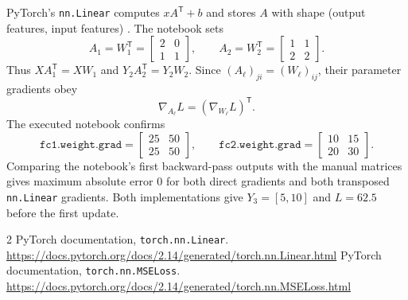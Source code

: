 \documentclass[11pt]{article}
\begin{document}
PyTorch's \texttt{nn.Linear} computes $xA^{\mathsf T}+b$ and stores $A$ with
shape (output features, input features) \cite{linear}. The notebook sets
\[
A_1=W_1^{\mathsf T}=\begin{bmatrix}2&0\\1&1\end{bmatrix},\qquad
A_2=W_2^{\mathsf T}=\begin{bmatrix}1&1\\2&2\end{bmatrix}.
\]
Thus $XA_1^{\mathsf T}=XW_1$ and $Y_2A_2^{\mathsf T}=Y_2W_2$.
Since $(A_\ell)_{ji}=(W_\ell)_{ij}$, their parameter gradients obey
\[
\nabla_{A_\ell}L=(\nabla_{W_\ell}L)^{\mathsf T}.
\]
The executed notebook confirms
\[
\texttt{fc1.weight.grad}=\begin{bmatrix}25&50\\25&50\end{bmatrix},\qquad
\texttt{fc2.weight.grad}=\begin{bmatrix}10&15\\20&30\end{bmatrix}.
\]
Comparing the notebook's first backward-pass outputs with the manual matrices
gives maximum absolute error $0$ for both direct gradients and both transposed
\texttt{nn.Linear} gradients. Both implementations give
$Y_3=[5,10]$ and $L=62.5$ before the first update.

\begingroup\small
\begin{thebibliography}{2}
 PyTorch documentation, \texttt{torch.nn.Linear}.
\url{https://docs.pytorch.org/docs/2.14/generated/torch.nn.Linear.html}
 PyTorch documentation, \texttt{torch.nn.MSELoss}.
\url{https://docs.pytorch.org/docs/2.14/generated/torch.nn.MSELoss.html}
\end{thebibliography}
\endgroup
\end{document}
